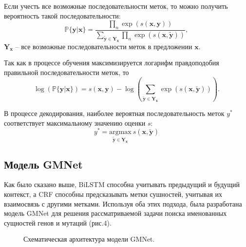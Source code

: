 \documentclass[12pt, a4paper]{article} %
\begin{document}
Если учесть все возможные последовательности меток, то можно получить вероятность такой последовательности:
$$\mathbb{P}\{\mathbf{y}|\mathbf{x}\}=\frac{\prod_{n}\exp(\mathit{s}\left(\mathbf{x},\mathbf{y}\right))}{\sum_{\tilde{\mathbf{y}}\in\mathbf{Y}_{\mathbf{x}}}\prod_{n}\exp(\mathit{s}\left(\mathbf{x},\tilde{\mathbf{y}}\right))},$$
$\mathbf{Y}_{\mathbf{x}}$ -- все возможные последовательности меток в предложении $\mathbf{x}$.

Так как в процессе обучения максимизируется логарифм правдоподобия правильной последовательности меток, то
$$\log(\mathbb{P}\{\mathbf{y}|\mathbf{x}\}) = \mathit{s}\left(\mathbf{x},\mathbf{y}\right) - \log\left(\sum_{\tilde{\mathbf{y}}\in\mathbf{Y}_{\mathbf{x}}}\exp(\mathit{s}\left(\mathbf{x},\tilde{\mathbf{y}}\right))\right).$$

В процессе декодирования, наиболее вероятная последовательность меток $\mathit{y}^*$ соответствует максимальному значению оценки $\mathit{s}$: 
$$\mathit{y}^* = \underset{\tilde{\mathbf{y}}\in\mathbf{Y}_{\mathbf{x}}}{\text{argmax}} ~ \mathit{s}\left(\mathbf{x},\tilde{\mathbf{y}}\right)$$

\subsection{Модель GMNet}

Как было сказано выше, BiLSTM способна учитывать предыдущий и будущий контекст, а CRF способны предсказывать метки сушностей, учитывая их взаимосвязь с другими метками. Используя оба этих подхода, была разработана модель GMNet для решения рассматриваемой задачи поиска именованных сущностей генов и мутаций (рис.4).
\begin{figure}[h]
	\caption{Схематическая архитектура модели GMNet.}
	\label{ris:image5}
\end{figure}
\end{document}
